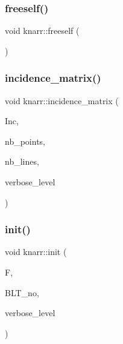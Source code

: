\subsubsection{\texorpdfstring{freeself()}{freeself()}}
{\footnotesize\ttfamily void knarr\+::freeself (\begin{DoxyParamCaption}{ }\end{DoxyParamCaption})}

\mbox{\label{classknarr_a17190785c3e2f76bb588be12ccd3e5f9}} 
\subsubsection{\texorpdfstring{incidence\+\_\+matrix()}{incidence\_matrix()}}
{\footnotesize\ttfamily void knarr\+::incidence\+\_\+matrix (\begin{DoxyParamCaption}\item[{\mbox{\hyperlink{galois_8h_a09fddde158a3a20bd2dcadb609de11dc}{I\+NT}} $\ast$\&}]{Inc,  }\item[{\mbox{\hyperlink{galois_8h_a09fddde158a3a20bd2dcadb609de11dc}{I\+NT}} \&}]{nb\+\_\+points,  }\item[{\mbox{\hyperlink{galois_8h_a09fddde158a3a20bd2dcadb609de11dc}{I\+NT}} \&}]{nb\+\_\+lines,  }\item[{\mbox{\hyperlink{galois_8h_a09fddde158a3a20bd2dcadb609de11dc}{I\+NT}}}]{verbose\+\_\+level }\end{DoxyParamCaption})}

\mbox{\label{classknarr_a1e25f28aeec8f316cc0ce81eb89e670e}} 
\subsubsection{\texorpdfstring{init()}{init()}}
{\footnotesize\ttfamily void knarr\+::init (\begin{DoxyParamCaption}\item[{\mbox{\hyperlink{classfinite__field}{finite\+\_\+field}} $\ast$}]{F,  }\item[{\mbox{\hyperlink{galois_8h_a09fddde158a3a20bd2dcadb609de11dc}{I\+NT}}}]{B\+L\+T\+\_\+no,  }\item[{\mbox{\hyperlink{galois_8h_a09fddde158a3a20bd2dcadb609de11dc}{I\+NT}}}]{verbose\+\_\+level }\end{DoxyParamCaption})}

